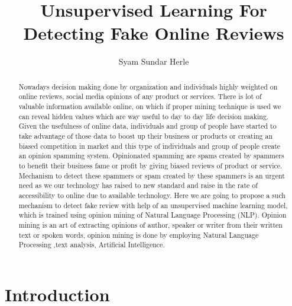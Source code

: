 \documentclass[sigconf]{acmart}
\begin{document}
\title{Unsupervised Learning For Detecting Fake Online Reviews}


\author{Syam Sundar Herle}


\begin{abstract}
Nowadays decision making done by organization and individuals highly weighted on online reviews, social media opinions of any product or services. There is lot of valuable information available online, on which if proper mining technique is used we can reveal hidden values which are way useful to day to day life decision making. Given the usefulness of online data, individuals and group of people have started to take advantage of those data to boost up their business or products or creating an biased competition in market and this type of individuals and group of people create an opinion spamming system. Opinionated spamming are spams created by spammers to benefit their business fame or profit by giving biased reviews of product or service. Mechanism to detect these spammers or spam created by these spammers is an urgent need as we our technology has raised to new standard and raise in the rate of accessibility to online due to available technology. Here we are going to propose a such mechanism to detect fake review with help of an unsupervised machine learning model, which is trained using opinion mining of Natural Language Processing (NLP). Opinion mining is an art of extracting opinions of author, speaker or writer from their written text or spoken words, opinion mining is done by employing Natural Language Processing ,text analysis, Artificial Intelligence. 

\end{abstract}


\maketitle

\section{Introduction}
\end{document}
